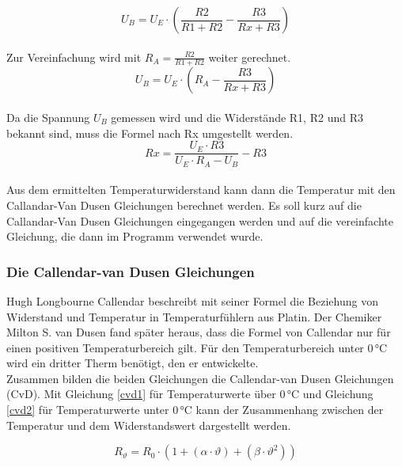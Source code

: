 \vspace{10pt}
\begin{equation}
	U_B = U_E \cdot \left(\frac{R2}{R1 + R2} - \frac{R3}{Rx + R3}\right)
\end{equation}
\vspace{10pt}
\\
Zur Vereinfachung wird mit \(R_A = \frac{R2}{R1 + R2}\) weiter gerechnet.
\\
\vspace{10pt}
\begin{equation}
	U_B = U_E \cdot \left( R_A - \frac{R3}{Rx + R3} \right)
\end{equation}
\vspace{10pt}
\\
Da die Spannung \(U_B\) gemessen wird und die Widerstände R1, R2 und R3 bekannt sind, muss die Formel nach Rx umgestellt werden. 
\\
\vspace{10pt}
\begin{equation}
	Rx = \frac{U_E \cdot R3}{U_E \cdot R_A - U_B} - R3
\end{equation}
\vspace{10pt}
\\
Aus dem ermittelten Temperaturwiderstand kann dann die Temperatur mit den Callandar-Van Dusen Gleichungen berechnet werden. Es soll kurz auf die Callandar-Van Dusen Gleichungen eingegangen werden und auf die vereinfachte Gleichung, die dann im Programm verwendet wurde.

\subsubsection{Die Callendar-van Dusen Gleichungen}
Hugh Longbourne Callendar beschreibt mit seiner Formel die Beziehung von Widerstand und Temperatur in Temperaturfühlern aus Platin. Der Chemiker Milton S. van Dusen fand später heraus, dass die Formel von Callendar nur für einen positiven Temperaturbereich gilt. Für den Temperaturbereich unter 0\,°C wird ein dritter Therm benötigt, den er entwickelte.
\cite{wikaCvD}
\\
Zusammen bilden die beiden Gleichungen die Callendar-van Dusen Gleichungen (CvD). Mit Gleichung \ref{cvd1} für Temperaturwerte über 0\,°C und Gleichung \ref{cvd2} für Temperaturwerte unter 0\,°C kann der Zusammenhang zwischen der Temperatur und dem Widerstandswert dargestellt werden.

\begin{equation}
	R_\vartheta = R_0 \cdot (1 + (\alpha \cdot \vartheta) + (\beta \cdot \vartheta^2))
	\label{cvd1}
\end{equation}

